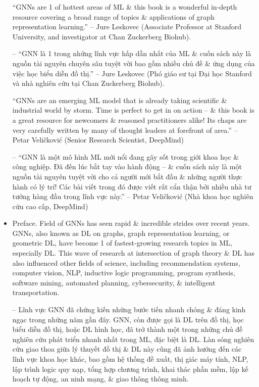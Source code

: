 \documentclass{article}
\begin{document}
\begin{itemize}
    ``GNNs are 1 of hottest areas of ML \& this book is a wonderful in-depth resource covering a broad range of topics \& applications of graph representation learning.'' -- Jure Leskovec (Associate Professor at Stanford University, and investigator at Chan Zuckerberg Biohub).

    -- ``GNN là 1 trong những lĩnh vực hấp dẫn nhất của ML \& cuốn sách này là nguồn tài nguyên chuyên sâu tuyệt vời bao gồm nhiều chủ đề \& ứng dụng của việc học biểu diễn đồ thị.'' -- Jure Leskovec (Phó giáo sư tại Đại học Stanford và nhà nghiên cứu tại Chan Zuckerberg Biohub).

    ``GNNs are an emerging ML model that is already taking scientific \& industrial world by storm. Time is perfect to get in on action -- \& this book is a great resource for newcomers \& reasoned practitioners alike! Its chaps are very carefully written by many of thought leaders at forefront of area.'' -- Petar Veličković (Senior Research Scientist, DeepMind)

    -- ``GNN là một mô hình ML mới nổi đang gây sốt trong giới khoa học \& công nghiệp. Đã đến lúc bắt tay vào hành động -- \& cuốn sách này là một nguồn tài nguyên tuyệt vời cho cả người mới bắt đầu \& những người thực hành có lý trí! Các bài viết trong đó được viết rất cẩn thận bởi nhiều nhà tư tưởng hàng đầu trong lĩnh vực này.'' -- Petar Veličković (Nhà khoa học nghiên cứu cao cấp, DeepMind)
    \item {\sf Preface.} Field of GNNs has seen rapid \& incredible strides over recent years. GNNs, also known as DL on graphs, graph representation learning, or geometric DL, have become 1 of fastest-growing research topics in ML, especially DL. This wave of research at intersection of graph theory \& DL has also influenced other fields of science, including recommendation systems, computer vision, NLP, inductive logic programming, program synthesis, software mining, automated planning, cybersecurity, \& intelligent transportation.

    -- Lĩnh vực GNN đã chứng kiến những bước tiến nhanh chóng \& đáng kinh ngạc trong những năm gần đây. GNN, còn được gọi là DL trên đồ thị, học biểu diễn đồ thị, hoặc DL hình học, đã trở thành một trong những chủ đề nghiên cứu phát triển nhanh nhất trong ML, đặc biệt là DL. Làn sóng nghiên cứu giao thoa giữa lý thuyết đồ thị \& DL này cũng đã ảnh hưởng đến các lĩnh vực khoa học khác, bao gồm hệ thống đề xuất, thị giác máy tính, NLP, lập trình logic quy nạp, tổng hợp chương trình, khai thác phần mềm, lập kế hoạch tự động, an ninh mạng, \& giao thông thông minh.


\end{itemize}
\end{document}

